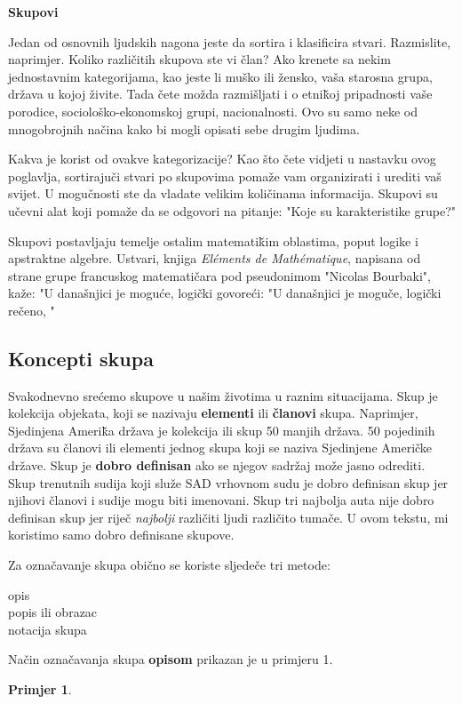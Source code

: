 \documentclass[a4paper, 14pt]{article}
\newtheorem{example}{Primjer}
\begin{document}
\begin{center}
\huge{\textbf{Skupovi}}\\[\baselineskip]
\end{center}
\begin{Large}
Jedan od osnovnih ljudskih nagona jeste da sortira i klasificira stvari. Razmislite, naprimjer. Koliko razli\v citih skupova ste vi \v clan? Ako krenete sa nekim jednostavnim kategorijama, kao jeste li mu\v sko ili \v zensko, va\v sa starosna grupa, dr\v zava u kojoj \v zivite. Tada \v cete mo\v zda razmi\v sljati i o etni\v koj pripadnosti va\v se porodice, sociolo\v sko-ekonomskoj grupi, nacionalnosti. Ovo su samo neke od mnogobrojnih na\v cina kako bi mogli opisati sebe drugim ljudima.

Kakva je korist od ovakve kategorizacije? Kao \v sto \v cete vidjeti u nastavku ovog poglavlja, sortiraju\v ci stvari po skupovima poma\v ze vam organizirati i urediti va\v s svijet. U mogu\v cnosti ste da vladate velikim koli\v cinama informacija. Skupovi su u\v cevni alat koji poma\v ze da se odgovori na pitanje: "Koje su karakteristike grupe?"

Skupovi postavljaju temelje ostalim matemati\v kim oblastima, poput logike i apstraktne algebre. Ustvari, knjiga \textit{El\' ements de Math\' ematique}, napisana od strane grupe francuskog matemati\v cara pod pseudonimom "Nicolas Bourbaki", ka\v ze: "U dana\v snjici je mogu\' ce, logi\v cki govore\' ci: "U dana\v snjici je mogu\v ce, logi\v cki re\v ceno, "

\vfill
\noindent{}
\end{Large}

\newpage
\subsection{Koncepti skupa}

Svakodnevno sre\' cemo skupove u na\v sim \v zivotima u raznim situacijama. Skup je kolekcija objekata, koji se nazivaju \textbf{elementi} ili \textbf{\v clanovi} skupa. Naprimjer, Sjedinjena Ameri\v ka dr\v zava je kolekcija ili skup 50 manjih dr\v zava. 50 pojedinih dr\v zava su \v clanovi ili elementi jednog skupa koji se naziva Sjedinjene Ameri\v cke dr\v zave.
Skup je \textbf{dobro definisan} ako se njegov sadr\v zaj mo\v ze jasno odrediti. Skup trenutnih sudija koji slu\v ze SAD vrhovnom sudu je dobro definisan skup jer njihovi \v clanovi i sudije mogu biti imenovani. Skup tri najbolja auta nije dobro definisan skup jer rije\v c \textit{najbolji} razli\v citi ljudi razli\v cito tuma\v ce. U ovom tekstu, mi koristimo samo dobro definisane skupove.

Za ozna\v cavanje skupa obi\v cno se koriste sljede\v ce tri metode:
\begin{center}
opis\\
popis ili obrazac\\
notacija skupa
\end{center}
Na\v cin ozna\v cavanja skupa \textbf{opisom} prikazan je u primjeru 1.
\begin{example}

\end{example}
\end{document}
